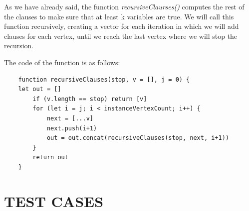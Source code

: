 \documentclass[table]{article}
\begin{document}
As we have already said, the function \textit{recursiveClaurses()} computes the rest of the clauses to make sure that at least k variables are true. 
We will call this function recursively, creating a vector for each iteration in which we will add clauses for each vertex, until we reach the last vertex where we will stop the recursion.

The code of the function is as follows:

\begin{lstlisting}
    function recursiveClauses(stop, v = [], j = 0) {
    let out = []
        if (v.length == stop) return [v]
        for (let i = j; i < instanceVertexCount; i++) {
            next = [...v]
            next.push(i+1)
            out = out.concat(recursiveClauses(stop, next, i+1))
        }
        return out
    }

\end{lstlisting}


\section{TEST CASES}
\end{document}
